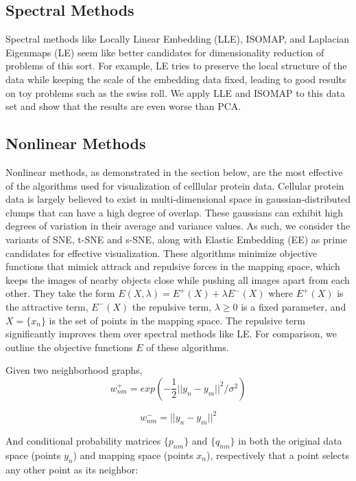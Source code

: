 \documentclass{article}
\begin{document}
\subsection{Spectral Methods}
Spectral methods like Locally Linear Embedding (LLE), ISOMAP, and Laplacian Eigenmaps (LE) seem like better candidates for dimensionality reduction of problems of this sort. For example, LE tries to preserve the local structure of the data while keeping the scale of the embedding data fixed, leading to good results on toy problems such as the swiss roll. We apply LLE and ISOMAP to this data set and show that the results are even worse than PCA.

\subsection{Nonlinear Methods}
Nonlinear methods, as demonstrated in the section below, are the most effective of the algorithms used for visualization of celllular protein data. Cellular protein data is largely believed to exist in multi-dimensional space in gaussian-distributed clumps that can have a high degree of overlap. These gaussians can exhibit high degrees of variation in their average and variance values. As such, we consider the variants of SNE, t-SNE and s-SNE, along with Elastic Embedding (EE) as prime candidates for effective visualization. These algorithms minimize objective functions that mimick attrack and repulsive forces in the mapping space, which keeps the images of nearby objects close while pushing all images apart from each other. They take the form $E(X, \lambda) = E^+(X) + \lambda E^-(X)$ where $E^+(X)$ is the attractive term, $E^-(X)$ the repulsive term, $\lambda \geq 0$ is a fixed parameter, and $X = \{x_n\}$ is the set of points in the mapping space. The repulsive term significantly improves them over spectral methods like LE. For comparison, we outline the objective functions $E$ of these algorithms.

Given two neighborhood graphs,
\begin{equation}
\label{wnm+}
w_{nm}^+ = exp(- \frac{1}{2} ||y_n - y_m||^2/\sigma^2) 
\end{equation}

\begin{equation}
\label{wnm-}
w_{nm}^- =||y_n - y_m||^2
\end{equation}

And conditional probability matrices $\{p_{nm}\}$ and $\{q_{nm}\}$ in both the original data space (points $y_n$) and mapping space (points $x_n$), respectively that a point selects any other point as its neighbor:
\end{document}
